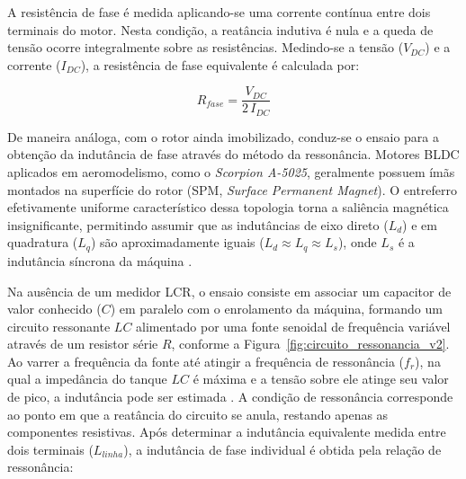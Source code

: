 A resistência de fase é medida aplicando-se uma corrente contínua entre dois terminais do motor. Nesta condição, a reatância indutiva é nula e a queda de tensão ocorre integralmente sobre as resistências. Medindo-se a tensão ($V_{DC}$) e a corrente ($I_{DC}$), a resistência de fase equivalente é calculada por:

\begin{equation}
    R_{fase} = \frac{V_{DC}}{2\,I_{DC}}
    \label{eq:resistencia_fase}
\end{equation}


De maneira análoga, com o rotor ainda imobilizado, conduz-se o ensaio para a
obtenção da indutância de fase através do método da ressonância. Motores BLDC
aplicados em aeromodelismo, como o \textit{Scorpion A-5025}, geralmente possuem
ímãs montados na superfície do rotor (SPM, \textit{Surface Permanent
Magnet}). O entreferro efetivamente uniforme característico dessa topologia
torna a saliência magnética insignificante, permitindo assumir que as
indutâncias de eixo direto ($L_d$) e em quadratura ($L_q$) são aproximadamente
iguais ($L_d \approx L_q \approx L_s$), onde $L_s$ é a indutância síncrona da
máquina \cite{Krishnan2017}.

Na ausência de um medidor LCR, o ensaio consiste em associar um capacitor de
valor conhecido ($C$) em paralelo com o enrolamento da máquina, formando um
circuito ressonante $LC$ alimentado por uma fonte senoidal de frequência
variável através de um resistor série $R$, conforme a
Figura~\ref{fig:circuito_ressonancia_v2}. Ao varrer a frequência da fonte até
atingir a frequência de ressonância ($f_r$), na qual a impedância do tanque
$LC$ é máxima e a tensão sobre ele atinge seu valor de pico, a indutância pode
ser estimada \cite{Fitzgerald2014}. A condição de ressonância corresponde ao
ponto em que a reatância do circuito se anula, restando apenas as componentes
resistivas. Após determinar a indutância equivalente medida entre dois
terminais ($L_{linha}$), a indutância de fase individual é obtida pela relação
de ressonância:

